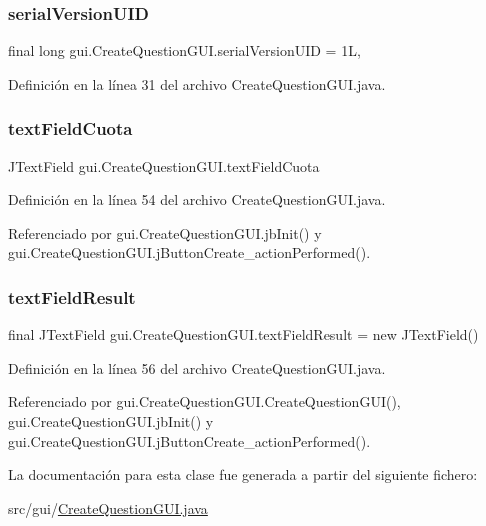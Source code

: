 \subsubsection{\texorpdfstring{serialVersionUID}{serialVersionUID}}
{\footnotesize\ttfamily final long gui.\+Create\+Question\+G\+U\+I.\+serial\+Version\+U\+ID = 1L\hspace{0.3cm}{\ttfamily [static]}, {\ttfamily [private]}}



Definición en la línea 31 del archivo Create\+Question\+G\+U\+I.\+java.

\mbox{\label{classgui_1_1CreateQuestionGUI_a78b0906d852838d49df52e2b407462bf}} 
\subsubsection{\texorpdfstring{textFieldCuota}{textFieldCuota}}
{\footnotesize\ttfamily J\+Text\+Field gui.\+Create\+Question\+G\+U\+I.\+text\+Field\+Cuota\hspace{0.3cm}{\ttfamily [private]}}



Definición en la línea 54 del archivo Create\+Question\+G\+U\+I.\+java.



Referenciado por gui.\+Create\+Question\+G\+U\+I.\+jb\+Init() y gui.\+Create\+Question\+G\+U\+I.\+j\+Button\+Create\+\_\+action\+Performed().

\mbox{\label{classgui_1_1CreateQuestionGUI_a4bedcfd1ede339a0bd85ae899b1dd3e2}} 
\subsubsection{\texorpdfstring{textFieldResult}{textFieldResult}}
{\footnotesize\ttfamily final J\+Text\+Field gui.\+Create\+Question\+G\+U\+I.\+text\+Field\+Result = new J\+Text\+Field()\hspace{0.3cm}{\ttfamily [private]}}



Definición en la línea 56 del archivo Create\+Question\+G\+U\+I.\+java.



Referenciado por gui.\+Create\+Question\+G\+U\+I.\+Create\+Question\+G\+U\+I(), gui.\+Create\+Question\+G\+U\+I.\+jb\+Init() y gui.\+Create\+Question\+G\+U\+I.\+j\+Button\+Create\+\_\+action\+Performed().



La documentación para esta clase fue generada a partir del siguiente fichero\+:\begin{DoxyCompactItemize}
\item 
src/gui/\mbox{\hyperlink{CreateQuestionGUI_8java}{Create\+Question\+G\+U\+I.\+java}}\end{DoxyCompactItemize}
